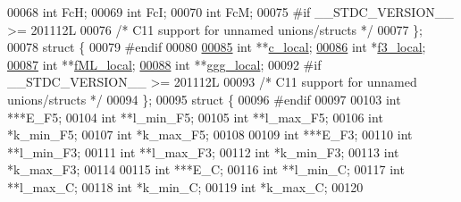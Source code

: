 \begin{DoxyCode}
00068       \textcolor{keywordtype}{int}     FcH;
00069       \textcolor{keywordtype}{int}     FcI;
00070       \textcolor{keywordtype}{int}     FcM;
00075 \textcolor{preprocessor}{#if \_\_STDC\_VERSION\_\_ >= 201112L}
00076     \textcolor{comment}{/* C11 support for unnamed unions/structs */}
00077     \};
00078     \textcolor{keyword}{struct }\{
00079 \textcolor{preprocessor}{#endif}
00080 
\hypertarget{dp__matrices_8h_source_l00085}{}\hyperlink{group__dp__matrices_a116c677ece0832e6ab9cc2fd1ebfe452}{00085}       \textcolor{keywordtype}{int}     **\hyperlink{group__dp__matrices_a116c677ece0832e6ab9cc2fd1ebfe452}{c\_local};    
\hypertarget{dp__matrices_8h_source_l00086}{}\hyperlink{group__dp__matrices_a6eae0a2b696b0c63bbaa78a70b950600}{00086}       \textcolor{keywordtype}{int}     *\hyperlink{group__dp__matrices_a6eae0a2b696b0c63bbaa78a70b950600}{f3\_local};    
\hypertarget{dp__matrices_8h_source_l00087}{}\hyperlink{group__dp__matrices_ad37d705240a8e6b1e9a4e4ea19e74003}{00087}       \textcolor{keywordtype}{int}     **\hyperlink{group__dp__matrices_ad37d705240a8e6b1e9a4e4ea19e74003}{fML\_local};  
\hypertarget{dp__matrices_8h_source_l00088}{}\hyperlink{group__dp__matrices_afd3ea65bc8f06559f7f1ea79072fa385}{00088}       \textcolor{keywordtype}{int}     **\hyperlink{group__dp__matrices_afd3ea65bc8f06559f7f1ea79072fa385}{ggg\_local};  
00092 \textcolor{preprocessor}{#if \_\_STDC\_VERSION\_\_ >= 201112L}
00093     \textcolor{comment}{/* C11 support for unnamed unions/structs */}
00094     \};
00095     \textcolor{keyword}{struct }\{
00096 \textcolor{preprocessor}{#endif}
00097 
00103       \textcolor{keywordtype}{int}             ***E\_F5;
00104       \textcolor{keywordtype}{int}             **l\_min\_F5;
00105       \textcolor{keywordtype}{int}             **l\_max\_F5;
00106       \textcolor{keywordtype}{int}             *k\_min\_F5;
00107       \textcolor{keywordtype}{int}             *k\_max\_F5;
00108 
00109       \textcolor{keywordtype}{int}             ***E\_F3;
00110       \textcolor{keywordtype}{int}             **l\_min\_F3;
00111       \textcolor{keywordtype}{int}             **l\_max\_F3;
00112       \textcolor{keywordtype}{int}             *k\_min\_F3;
00113       \textcolor{keywordtype}{int}             *k\_max\_F3;
00114 
00115       \textcolor{keywordtype}{int}             ***E\_C;
00116       \textcolor{keywordtype}{int}             **l\_min\_C;
00117       \textcolor{keywordtype}{int}             **l\_max\_C;
00118       \textcolor{keywordtype}{int}             *k\_min\_C;
00119       \textcolor{keywordtype}{int}             *k\_max\_C;
00120 

\end{DoxyCode}
